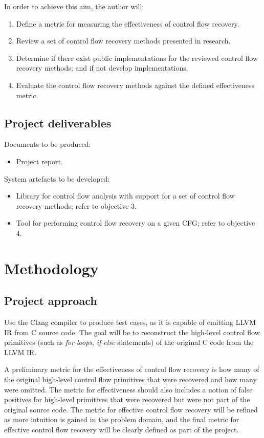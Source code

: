 \documentclass[12pt, a4paper]{article}
\begin{document}
In order to achieve this aim, the author will:

\begin{enumerate}
	\item Define a metric for measuring the effectiveness of control flow recovery.
	\item Review a set of control flow recovery methods presented in research.
	\item Determine if there exist public implementations for the reviewed control flow recovery methods; and if not develop implementations.
	\item Evaluate the control flow recovery methods against the defined effectiveness metric.
\end{enumerate}

\subsection{Project deliverables}

Documents to be produced:

\begin{itemize}
	\item Project report.
\end{itemize}

System artefacts to be developed:

\begin{itemize}
	\item Library for control flow analysis with support for a set of control flow recovery methods; refer to objective 3.
	\item Tool for performing control flow recovery on a given CFG; refer to objective 4.
\end{itemize}

\section{Methodology}

\subsection{Project approach}

Use the Clang compiler to produce test cases, as it is capable of emitting LLVM IR from C source code. The goal will be to reconstruct the high-level control flow primitives (such as \textit{for-loops}, \textit{if-else} statements) of the original C code from the LLVM IR.

A preliminary metric for the effectiveness of control flow recovery is how many of the original high-level control flow primitives that were recovered and how many were omitted. The metric for effectiveness should also includes a notion of false positives for high-level primitives that were recovered but were not part of the original source code. The metric for effective control flow recovery will be refined as more intuition is gained in the problem domain, and the final metric for effective control flow recovery will be clearly defined as part of the project.
\end{document}
